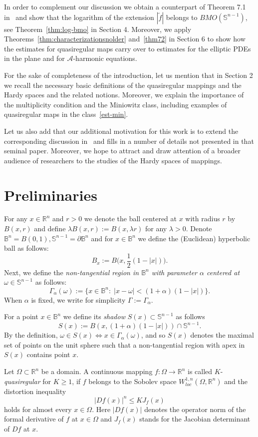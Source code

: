 \documentclass[11pt,a4paper,reqno]{amsart}
\theoremstyle{definition}
\newcommand{\Om}{\Omega}
\newcommand{\om}{\omega}
\newcommand{\B}{\mathbb{B}^n}
\newcommand{\R}{\mathbb{R}}
\newcommand{\Rn}{{\mathbb R}^n}
\newcommand{\Sn}{\mathbb{S}^{n-1}}
\newcommand{\A}{\mathcal{A}}
\numberwithin{komcounter}{section}
\begin{document}
In order to complement our discussion we obtain a counterpart of Theorem 7.1 in~\cite{ak} and show that the logarithm of the extension $|\tilde{f}|$ belongs to $BMO(\Sn)$, see Theorem~\ref{thm:log-bmo} in Section 4. Moreover, we apply Theorems~\ref{thm:characterizationsnolder} and~\ref{thm72} in Section 6 to show how the estimates for quasiregular maps carry over to estimates for the elliptic PDEs in the plane and for $\A$-harmonic equations. 

For the sake of completeness of the introduction, let us mention that in Section 2 we recall the necessary basic definitions of the quasiregular mappings and the Hardy spaces and the related notions. Moreover, we explain the importance of the multiplicity condition and the Miniowitz class, including examples of quasiregular maps in the class~\eqref{est-min}.

Let us also add that our additional motivation for this work is to extend the corresponding discussion in~\cite{ak} and fills in a number of details not presented in that seminal paper. Moreover, we hope to attract and draw attention of a broader audience of researchers to the studies of the Hardy spaces of mappings.

\section{Preliminaries}
For any $x\in \R^n$ and $r>0$ we denote the ball centered at $x$ with radius $r$ by $B(x,r)$ and define $\lambda B(x,r):=B(x,\lambda r)$ for any $\lambda >0$. Denote $\B=B(0,1), \Sn=\partial \B$ and for $x\in \B$ we define the (Euclidean) hyperbolic ball as follows:
$$
B_x:=B\Big(x, \frac{1}{2}(1-|x|)\Big).
$$
Next, we define the \emph{non-tangential region in $\B$ with parameter $\alpha$ centered at $\omega\in \Sn$} as follows:
\begin{equation}\label{def-cone}
\Gamma_{\alpha}(\omega):=\{x \in \B:\; |x-\om| < (1+\alpha)(1-|x|)\}.
\end{equation}
When $\alpha$ is fixed, we write for simplicity $\Gamma:=\Gamma_{\alpha}$. 

For a point $x\in \B$ we define its \emph{shadow} $S(x)\subset \Sn$ as follows
\[
S(x):=B(x, (1+\alpha)(1-|x|)) \cap \Sn.
\]
By the definition, $\om\in S(x) \Leftrightarrow x\in \Gamma_\alpha(\om)$, and so $S(x)$ denotes the maximal set of points on the unit sphere such that a non-tangential region with apex in $S(x)$ contains point $x$.
\smallskip

  Let $\Om\subset \Rn$ be a domain. A continuous mapping $f:\Om \rightarrow \mathbb{R}^n$  is called $K$-\emph{quasiregular} for $K\geq 1$, if $f$ belongs to the Sobolev space $W_{loc}^{1,n}(\Om, \Rn)$ and the distortion inequality
\begin{equation*}%
  |Df(x)|^n\leq  K J_f (x)
\end{equation*}
  holds for almost every $x\in \Om$. Here $|Df(x)|$ denotes the operator norm of the formal derivative of $f$ at $x\in \Om$ and $J_f(x)$ stands for the Jacobian determinant of $Df$ at $x$.
\end{document}
